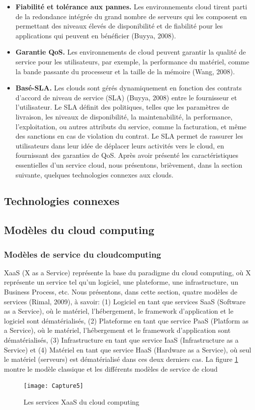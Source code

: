 \begin{itemize}
    	\item \textbf{Fiabilité et tolérance aux pannes.} Les environnements cloud tirent parti de la redondance intégrée du grand nombre de serveurs qui les composent en permettant des niveaux élevés de disponibilité et de fiabilité pour les applications qui peuvent en bénéficier (Buyya, 2008). 
    	\item \textbf{Garantie QoS.} Les environnements de cloud peuvent garantir la qualité de service pour les utilisateurs, par exemple, la performance du matériel, comme la bande passante du processeur et la taille de la mémoire (Wang, 2008). 
    	\item \textbf{Basé-SLA.} Les clouds sont gérés dynamiquement en fonction des contrats d’accord de niveau de service (SLA) (Buyya, 2008) entre le fournisseur et l’utilisateur. Le SLA définit des politiques, telles que les paramètres de livraison, les niveaux de disponibilité, la maintenabilité, la performance, l'exploitation, ou autres attributs du service, comme la facturation, et même des sanctions en cas de violation du contrat. Le SLA permet de rassurer les utilisateurs dans leur idée de déplacer leurs activités vers le cloud, en fournissant des garanties de QoS. 
    	Après avoir présenté les caractéristiques essentielles d’un service cloud, nous présentons, brièvement, dans la section suivante, quelques technologies connexes aux clouds.
    	
    \end{itemize} 
\subsection{Technologies connexes }

\subsection{Modèles du cloud computing  }
\subsubsection {Modèles de service du cloudcomputing}  
XaaS (X as a Service) représente la base du paradigme du cloud computing, où X représente un service tel qu’un logiciel, une plateforme, une infrastructure, un Business Process, etc. Nous présentons, dans cette section,  quatre  modèles de services (Rimal, 2009), à savoir: (1) Logiciel en tant que services SaaS (Software as a Service), où le matériel, l’hébergement, le framework d’application et le logiciel sont dématérialisés, (2) Plateforme en tant que service PaaS (Platform as a Service), où le matériel, l’hébergement et le framework d’application sont dématérialisés, (3) Infrastructure en tant que service IaaS (Infrastructure as a Service) et (4) Matériel en tant que service HaaS (Hardware as a Service), où seul le matériel (serveurs) est dématérialisé dans ces deux derniers cas. La figure \ref{fig:capture5} montre le modèle classique et les différents modèles de service de cloud
\begin{figure}[h]
	\centering
	\texttt{[image: Capture5]}
	\caption{Les services XaaS du cloud computing}
	\label{fig:capture5}
\end{figure}

